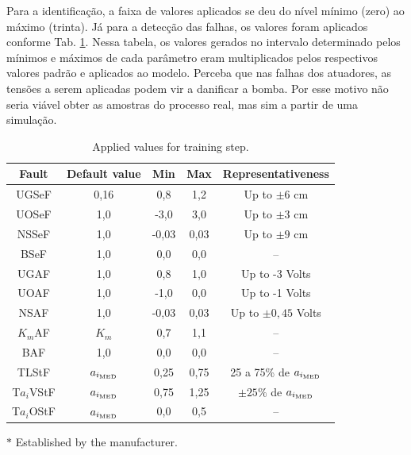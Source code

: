 \documentclass[10pt,fleqn,a4paper]{article}
\begin{document}
Para a identificação, a faixa de valores aplicados se deu do nível mínimo (zero)
ao máximo (trinta). Já para a detecção das falhas, os valores foram aplicados
conforme Tab. \ref{tab:values}. Nessa tabela, os valores gerados no intervalo
determinado pelos mínimos e máximos de cada parâmetro eram multiplicados pelos
respectivos valores padrão e aplicados ao modelo. Perceba que nas falhas dos
atuadores, as tensões a serem aplicadas podem vir a danificar a bomba. Por esse
motivo não seria viável obter as amostras do processo real, mas sim a partir de
uma simulação.

\begin{table}[htb]
\small
\caption{Applied values for training step.}
\label{tab:values}
\centering
\begin{threeparttable}
\begin{tabular}{|c|c|c|c|c|}
\hline
{\bf Fault} & {\bf Default value} & {\bf Min} & {\bf Max} & 
{\bf Representativeness}\\
\hline
UGSeF & 0,16\tnote{$*$} & 
0,8 & 1,2 & Up to $\pm 6$ cm\\
\hline
UOSeF & 1,0 & -3,0 & 3,0 & Up to $\pm 3$ cm\\
\hline
NSSeF & 1,0 & -0,03 & 0,03 & Up to $\pm 9$ cm\\
\hline
BSeF & 1,0 & 0,0 & 0,0 & -- \\
\hline
UGAF & 1,0 & 0,8 & 1,0 & Up to -3 Volts\\
\hline
UOAF & 1,0 & -1,0 & 0,0 & Up to -1 Volts\\
\hline
NSAF & 1,0 & -0,03 & 0,03 & Up to $\pm 0,45$ Volts\\
\hline
$K_m$AF & $K_m$ & 0,7 & 1,1 & --\\
\hline
BAF & 1,0 & 0,0 & 0,0 & --\\
\hline
TLStF & $a_{i_{\text{\tiny MED}}}$ & 
0,25 & 0,75 & 25 a 75\% de $a_{i_{\text{\tiny MED}}}$\\
\hline
T$a_i$VStF & $a_{i_{\text{\tiny MED}}}$ & 
0,75 & 1,25 & $\pm 25\%$ de $a_{i_{\text{\tiny MED}}}$\\
\hline
T$a_i$OStF & $a_{i_{\text{\tiny MED}}}$ & 
0,0 & 0,5 & --\\
\hline
\end{tabular}
\begin{tablenotes}
\item [$*$] Established by the manufacturer.
\end{tablenotes}
\end{threeparttable}
\end{table}
\end{document}
